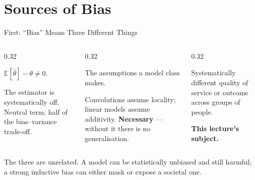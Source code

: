 \section{Sources of Bias}

\begin{frame}{First: ``Bias'' Means Three Different Things}

    \begin{columns}[T]
        \begin{column}{0.32\textwidth}
            \begin{tcolorbox}[colback=gray!8, colframe=gray!60, title=Statistical bias]
                \small
                $\mathbb{E}[\hat{\theta}] - \theta \neq 0$.

                \vspace{0.4em}
                The estimator is systematically off. Neutral term; half of the
                bias--variance trade-off.
            \end{tcolorbox}
        \end{column}
        \begin{column}{0.32\textwidth}
            \begin{tcolorbox}[colback=raiBlue!5, colframe=raiBlue!60, title=Inductive bias]
                \small
                The assumptions a model class makes.

                \vspace{0.4em}
                Convolutions assume locality; linear models assume additivity.
                \textbf{Necessary} --- without it there is no generalisation.
            \end{tcolorbox}
        \end{column}
        \begin{column}{0.32\textwidth}
            \begin{tcolorbox}[colback=raiRed!5, colframe=raiRed!70, title=Societal / harmful bias]
                \small
                Systematically different quality of service or outcome across groups of people.

                \vspace{0.4em}
                \textbf{This lecture's subject.}
            \end{tcolorbox}
        \end{column}
    \end{columns}

    \vspace{1.2em}

    \begin{block}{}
        \centering
        The three are unrelated. A model can be statistically unbiased and still harmful; a strong
        inductive bias can either mask or expose a societal one.
    \end{block}
\end{frame}
